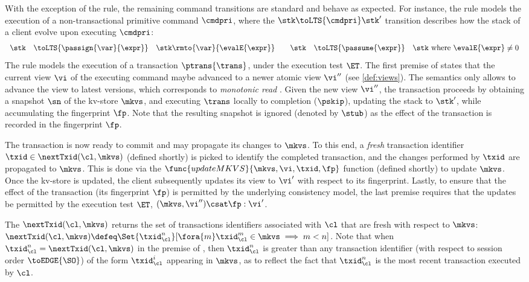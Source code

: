 With the exception of the  rule, the remaining command transitions are standard and behave as expected. 
For instance, the  rule models the execution of a non-transactional primitive command $\cmdpri$, where the $\stk \toLTS{\cmdpri} \stk'$ transition describes how the stack of a client 
evolve upon executing $\cmdpri$:
\[
\begin{array}{rcl @{\qquad} rcl}
\stk  & \toLTS{\passign{\var}{\expr}} & \stk\rmto{\var}{\evalE{\expr}} &
\stk  & \toLTS{\passume{\expr}} & \stk \text{ where } \evalE{\expr} \neq 0 \\
\end{array}                                                                                               
\]
%
%
The  rule models the execution of a transaction $\ptrans{\trans}$, under the execution test $\ET$. 
The first premise of  states that the current view $\vi$ of the executing command maybe advanced to a newer atomic view $\vi''$ (see \cref{def:views}). 
The semantics only allows to advance the view to latest versions, which corresponds to \emph{monotonic read} \cite{.......}.
Given the new view $\vi''$, the transaction proceeds by obtaining a snapshot $\sn$ of the kv-store $\mkvs$, and executing $\trans$ locally to completion ($\pskip$), updating the stack to $\stk'$, while accumulating the fingerprint $\fp$. Note that the resulting snapshot is ignored (denoted by $\stub$) as the effect of the transaction is recorded in the fingerprint $\fp$. 
%

The transaction is now ready to commit and may propagate its changes to $\mkvs$.
To this end, a \emph{fresh} transaction identifier $\txid \in \nextTxid(\cl, \mkvs)$ (defined shortly) is picked
to identify the completed transaction, and the changes performed by $\txid$ are propagated to $\mkvs$. 
This is done via the $\func{updateMKVS}{\mkvs, \vi, \txid, \fp}$ function (defined shortly) to update $\mkvs$. 
Once the kv-store is updated, the client subsequently updates its view to $\vi'$ with respect to its fingerprint. 
Lastly, to ensure that the effect of the transaction (its fingerprint  $\fp$) is permitted by the underlying consistency model, 
the last premise requires that the updates be permitted by the execution test $\ET$, \ie \( (\mkvs, \vi'') \csat \fp : \vi'\).

The $\nextTxid(\cl, \mkvs)$ returns the set of transactions identifiers associated with $\cl$ that are fresh with respect to $\mkvs$: 
$\nextTxid(\cl, \mkvs) \defeq \Set{\txid_{\cl}^{n}}[\fora{m} \txid_{\cl}^{m} \in \mkvs \implies m < n ]$.
Note that when $\txid_\cl^n = \nextTxid(\cl, \mkvs)$ in the premise of , then $\txid_\cl^n$ is greater than any transaction identifier 
(with respect to session order $\toEDGE{\SO}$) 
of the form $\txid_{\cl}^{i}$ appearing in $\mkvs$,
as to reflect the fact that $\txid_\cl^n$ is the most recent transaction executed by $\cl$.

